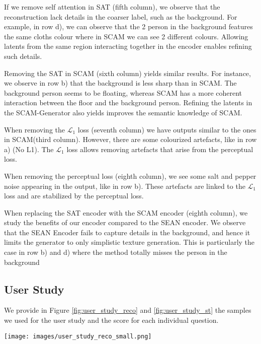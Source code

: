 \documentclass[runningheads]{llncs}
\makeatletter
\newcommand{\mname}{SCAM\@\xspace}
\makeatother
\begin{document}
If we remove self attention in SAT (fifth column), we observe that the reconstruction lack details in the coarser label, such as the background. For example, in row d), we can observe that the 2 person in the background features the same cloths colour where in SCAM we can see 2 different colours. Allowing latents from the same region interacting together in the encoder enables refining such details.

Removing the SAT in SCAM (sixth column) yields similar results. For instance, we observe in row b) that the background is less sharp than in \mname. The background person seems to be floating, whereas \mname has a more coherent interaction between the floor and the background person. Refining the latents in the SCAM-Generator also yields improves the semantic knowledge of SCAM.


When removing the $\mathcal{L}_1$ loss (seventh column) we have outputs similar to the ones in \mname (third column). However, there are some colourized artefacts, like in row a) (No L1). The $\mathcal{L}_1$ loss allows removing artefacts that arise from the perceptual loss.

When removing the perceptual loss (eighth column), we see some salt and pepper noise appearing in the output, like in row b). These artefacts are linked to the $\mathcal{L}_1$ loss and are stabilized by the perceptual loss.

When replacing the SAT encoder with the SCAM encoder (eighth column), we study the benefits of our encoder compared to the SEAN encoder. We observe that the SEAN Encoder fails to capture details in the background, and hence it limits the generator to only simplistic texture generation. This is particularly the case in row b) and d)  where the method totally misses the person in the background

\subsection{User Study}
We provide in Figure \ref{fig:user_study_reco} and \ref{fig:user_study_st} the samples we used for the user study and the score for each individual question.
\begin{figure*}[t!]
    \centering
    \texttt{[image: images/user\_study\_reco\_small.png]}
     \caption{
     \small{\textbf{User study on reconstruction}. 
     We provide here the samples that were used to evaluate the reconstruction quality on SCAM, SEAN and INADE in a user study. Note that we provide here the segmentation mask for reference but it was not provided to users.
     }}
    \label{fig:user_study_reco}
\end{figure*}
\end{document}
